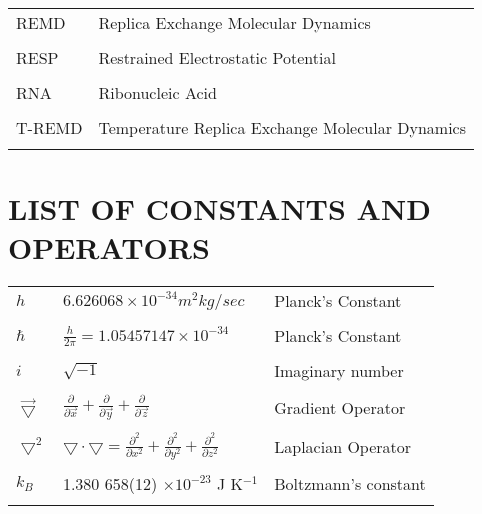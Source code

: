 \begin{tabular}{lp{5in}}
REMD & Replica Exchange Molecular Dynamics \\ \\

RESP & Restrained Electrostatic Potential \\ \\

RNA & Ribonucleic Acid \\ \\

T-REMD & Temperature Replica Exchange Molecular Dynamics \\ \\

\end{tabular}

\chapter*{LIST OF CONSTANTS AND OPERATORS}

\begin{tabular}{p{1.2in}p{2.5in}p{2.5in}}

$h$ & $6.626068 \times 10 ^ {-34} m^2kg/sec$ & Planck's Constant \\ \\

$\hbar$ & $\frac h {2 \pi} = 1.05457147 \times 10 ^ {-34}$ & 
          Planck's Constant \\ \\

$i$ & $\sqrt{-1}$ & Imaginary number \\ \\

$\vec{\bigtriangledown}$ & $\frac{\partial}{\partial \vec{x}} +
\frac{\partial}{\partial \vec{y}} + \frac {\partial}{\partial \vec{z}}$ &
Gradient Operator \\ \\

$\bigtriangledown^2$ & $\bigtriangledown \cdot \bigtriangledown = \frac
{\partial ^2} {\partial x ^2} + \frac {\partial ^2} {\partial y^2} + \frac
{\partial ^2} {\partial z ^2}$ & Laplacian Operator \\ \\

$k_B$ & 1.380 658(12) $\times 10 ^ {-23}$ J K$^{-1}$ &
Boltzmann's constant \cite{CRC_Book} \\ \\

\end{tabular}
